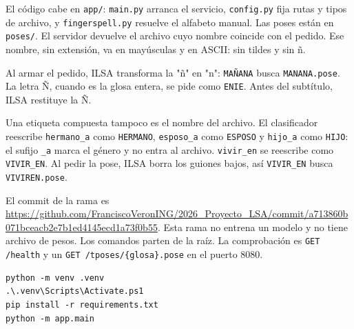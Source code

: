 El código cabe en \texttt{app/}: \texttt{main.py} arranca el servicio, \texttt{config.py} fija rutas y tipos de archivo, y \texttt{fingerspell.py} resuelve el alfabeto manual. Las poses están en \texttt{poses/}. El servidor devuelve el archivo cuyo nombre coincide con el pedido. Ese nombre, sin extensión, va en mayúsculas y en ASCII: sin tildes y sin ñ.

Al armar el pedido, ILSA transforma la "ñ" en "n": \texttt{MAÑANA} busca \texttt{MANANA.pose}. La letra Ñ, cuando es la glosa entera, se pide como \texttt{ENIE}. Antes del subtítulo, ILSA restituye la Ñ.

Una etiqueta compuesta tampoco es el nombre del archivo. El clasificador reescribe \texttt{hermano\_a} como \texttt{HERMANO}, \texttt{esposo\_a} como \texttt{ESPOSO} y \texttt{hijo\_a} como \texttt{HIJO}: el sufijo \texttt{\_a} marca el género y no entra al archivo. \texttt{vivir\_en} se reescribe como \texttt{VIVIR\_EN}. Al pedir la pose, ILSA borra los guiones bajos, así \texttt{VIVIR\_EN} busca \texttt{VIVIREN.pose}.

El commit de la rama es \url{https://github.com/FranciscoVeronING/2026_Proyecto_LSA/commit/a713860b071bceacb2e7b1ed4145ecd1a73f0b55}. Esta rama no entrena un modelo y no tiene archivo de pesos. Los comandos parten de la raíz. La comprobación es \texttt{GET /health} y un \texttt{GET /tposes/\{glosa\}.pose} en el puerto 8080.

\begin{lstlisting}
python -m venv .venv
.\.venv\Scripts\Activate.ps1
pip install -r requirements.txt
python -m app.main
\end{lstlisting}
